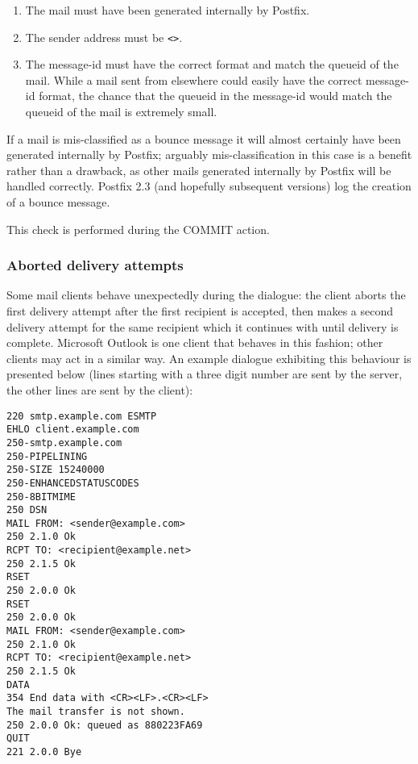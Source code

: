 \begin{enumerate}

    \item The mail must have been generated internally by Postfix.

    \item The sender address must be \verb!<>!.

    \item The message-id must have the correct format and match the queueid
        of the mail.  While a mail sent from elsewhere could easily have
        the correct message-id format, the chance that the queueid in the
        message-id would match the queueid of the mail is extremely small.

\end{enumerate}

If a mail is mis-classified as a bounce message it will almost certainly
have been generated internally by Postfix; arguably mis-classification in
this case is a benefit rather than a drawback, as other mails generated
internally by Postfix will be handled correctly.  Postfix 2.3 (and
hopefully subsequent versions) log the creation of a bounce message.

This check is performed during the COMMIT action.

\subsubsection{Aborted delivery attempts}

\label{aborted-delivery-attempts}

Some mail clients behave unexpectedly during the \SMTP{} dialogue: the
client aborts the first delivery attempt after the first recipient is
accepted, then makes a second delivery attempt for the same recipient which
it continues with until delivery is complete.  Microsoft Outlook is one
client that behaves in this fashion; other clients may act in a similar
way.  An example dialogue exhibiting this behaviour is presented below
(lines starting with a three digit number are sent by the server, the other
lines are sent by the client):

\begin{verbatim}
220 smtp.example.com ESMTP
EHLO client.example.com
250-smtp.example.com
250-PIPELINING
250-SIZE 15240000
250-ENHANCEDSTATUSCODES
250-8BITMIME
250 DSN
MAIL FROM: <sender@example.com>
250 2.1.0 Ok
RCPT TO: <recipient@example.net>
250 2.1.5 Ok
RSET
250 2.0.0 Ok
RSET
250 2.0.0 Ok
MAIL FROM: <sender@example.com>
250 2.1.0 Ok
RCPT TO: <recipient@example.net>
250 2.1.5 Ok
DATA
354 End data with <CR><LF>.<CR><LF>
The mail transfer is not shown.
250 2.0.0 Ok: queued as 880223FA69
QUIT
221 2.0.0 Bye
\end{verbatim}

